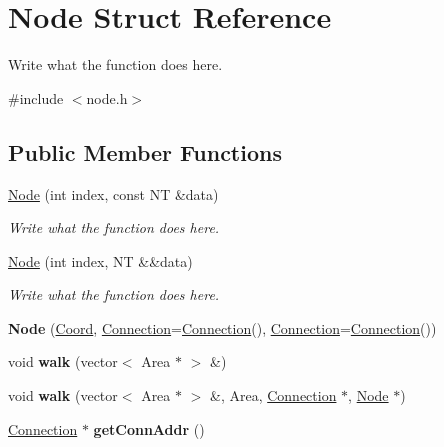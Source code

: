 \hypertarget{structNode}{\section{Node Struct Reference}
\label{structNode}
}


Write what the function does here.  




{\ttfamily \#include $<$node.\+h$>$}

\subsection*{Public Member Functions}
\begin{DoxyCompactItemize}
\item 
\hyperlink{structNode_afc388bc3956f19cae938c60ae41eae64}{Node} (int index, const N\+T \&data)
\begin{DoxyCompactList}\small\item\em Write what the function does here. \end{DoxyCompactList}\item 
\hyperlink{structNode_a9ba63595eac1a32f14a40788704214ce}{Node} (int index, N\+T \&\&data)
\begin{DoxyCompactList}\small\item\em Write what the function does here. \end{DoxyCompactList}\item 
\hypertarget{structNode_a8967a8ea2f7e45ab5d400eb4fb5a5b8f}{{\bfseries Node} (\hyperlink{structCoord}{Coord}, \hyperlink{structConnection}{Connection}=\hyperlink{structConnection}{Connection}(), \hyperlink{structConnection}{Connection}=\hyperlink{structConnection}{Connection}())}\label{structNode_a8967a8ea2f7e45ab5d400eb4fb5a5b8f}

\item 
\hypertarget{structNode_aa7323fcd726f9d02be5a36017b983b2d}{void {\bfseries walk} (vector$<$ Area $\ast$ $>$ \&)}\label{structNode_aa7323fcd726f9d02be5a36017b983b2d}

\item 
\hypertarget{structNode_aed462601aaebbbf910008326032619c6}{void {\bfseries walk} (vector$<$ Area $\ast$ $>$ \&, Area, \hyperlink{structConnection}{Connection} $\ast$, \hyperlink{structNode}{Node} $\ast$)}\label{structNode_aed462601aaebbbf910008326032619c6}

\item 
\hypertarget{structNode_a84e440c7e885d9c9e2e72386a351ddb3}{\hyperlink{structConnection}{Connection} $\ast$ {\bfseries get\+Conn\+Addr} ()}\label{structNode_a84e440c7e885d9c9e2e72386a351ddb3}


\end{DoxyCompactItemize}
